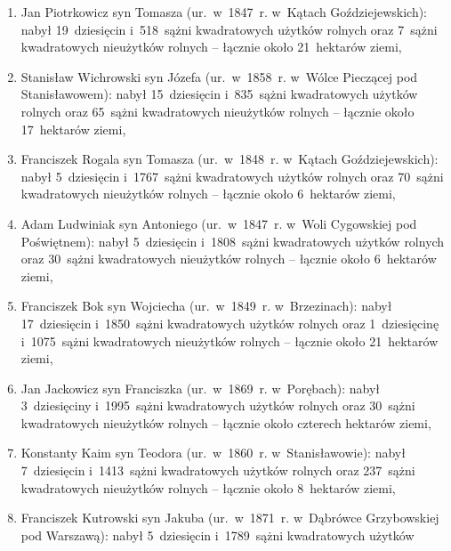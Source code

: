 \begin{enumerate}
    \item Jan Piotrkowicz syn Tomasza (ur.~w~1847~r. w~Kątach
    Goździejewskich): nabył 19~dziesięcin i~518~sążni kwadratowych użytków
    rolnych oraz 7~sążni kwadratowych nieużytków rolnych -- łącznie około
    21~hektarów ziemi,
    \item Stanisław Wichrowski syn Józefa (ur.~w~1858~r. w~Wólce Pieczącej pod
    Stanisławowem): nabył 15~dziesięcin i~835~sążni kwadratowych użytków
    rolnych oraz 65~sążni kwadratowych nieużytków rolnych -- łącznie około
    17~hektarów ziemi,
    \item Franciszek Rogala syn Tomasza (ur.~w~1848~r. w~Kątach
    Goździejewskich): nabył 5~dziesięcin i~1767~sążni kwadratowych użytków
    rolnych oraz 70~sążni kwadratowych nieużytków rolnych -- łącznie około
    6~hektarów ziemi,
    \item Adam Ludwiniak syn Antoniego (ur.~w~1847~r. w~Woli Cygowskiej pod
    Poświętnem): nabył 5~dziesięcin i~1808~sążni kwadratowych użytków rolnych
    oraz 30~sążni kwadratowych nieużytków rolnych -- łącznie około 6~hektarów
    ziemi,
    \item Franciszek Bok syn
    Wojciecha (ur.~w~1849~r. w~Brzezinach): nabył 17~dziesięcin i~1850~sążni
    kwadratowych użytków rolnych oraz 1~dziesięcinę i~1075~sążni kwadratowych
    nieużytków rolnych -- łącznie około 21~hektarów ziemi,
    \item Jan Jackowicz syn
    Franciszka (ur.~w~1869~r. w~Porębach): nabył 3~dziesięciny i~1995~sążni
    kwadratowych użytków rolnych oraz 30~sążni kwadratowych nieużytków rolnych
    -- łącznie około czterech hektarów ziemi,
    \item Konstanty Kaim syn
    Teodora (ur.~w~1860~r. w~Stanisławowie): nabył 7~dziesięcin i~1413~sążni
    kwadratowych użytków rolnych oraz 237~sążni kwadratowych nieużytków
    rolnych -- łącznie około 8~hektarów ziemi,
    \item Franciszek Kutrowski syn Jakuba (ur.~w~1871~r. w~Dąbrówce Grzybowskiej pod
    Warszawą): nabył 5~dziesięcin i~1789~sążni kwadratowych użytków

\end{enumerate}

